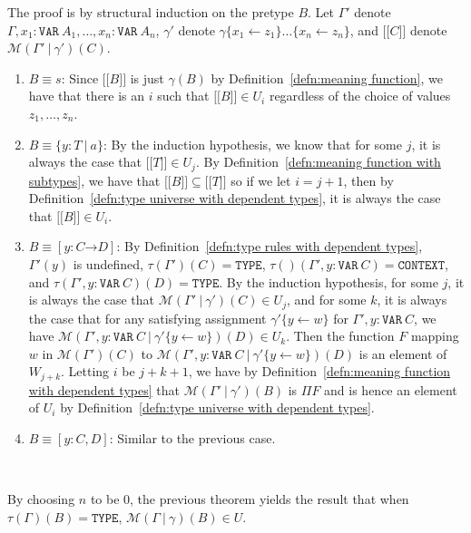 \documentclass [12pt,twoside]{cslreport}
\newcommand{\thmbox}
   {{\ \hfill\hbox{%
      \vrule width1.0ex height1.0ex
   }\parfillskip 0pt }}
\newenvironment{proof}{{\bf Proof. }}{\thmbox}
\newcommand{\aro}{\mathord\rightarrow} %
\newcommand{\mean}[1]{\lbrack\!\lbrack #1 \rbrack\!\rbrack}
\newcommand{\funtype}[2]{[#1 \aro #2]}
\newcommand{\tupletype}[1]{[#1]}
\newcommand{\tauGamma}[1]{\tau(\Gamma)(#1)}
\newcommand{\Mgamma}[1]{{\mathcal M}(\Gamma\vbar\gamma)(#1)}
\newcommand{\tttype}{\mathtt{TYPE}}
\newcommand{\ttcontext}{\mathtt{CONTEXT}}
\newcommand{\ttvar}{\mathtt{VAR}}
\newcommand{\vbar}{\ |\ }
\begin{document}
\begin{proof}
The proof is by structural induction on the pretype $B$\@.
Let $\Gamma'$ denote $\Gamma, x_1:\ttvar~A_1, \ldots, x_n:\ttvar~A_n$,
$\gamma'$ denote $\gamma\{x_1\gets z_1\}\ldots\{x_n\gets z_n\}$, and 
$\mean{C}$ denote $\mathcal{M}(\Gamma'\vbar
\gamma')(C)$.  
\begin{enumerate}
\item $B\equiv s$: Since $\mean{B}$ is just $\gamma(B)$ by
Definition~\ref{defn:meaning function}, we have that there is an $i$
such that $\mean{B}\in U_i$ regardless of the choice of values
$z_1,\ldots, z_n$\@.  

\item $B\equiv \{y:T\vbar a\}$: By the induction hypothesis, we know that
for some $j$, it is always the case that $\mean{T}\in U_j$\@.  By
Definition~\ref{defn:meaning function with subtypes}, we have that
$\mean{B}\subseteq \mean{T}$ so if we let $i = j+1$, then
by Definition~\ref{defn:type universe with dependent types},
it is always the case that $\mean{B}\in U_i$\@.

\item $B \equiv \funtype{y:C}{D}$: By
Definition~\ref{defn:type rules with dependent types},
$\Gamma'(y)$ is undefined, $\tau(\Gamma')(C) = \tttype$,
$\tau()(\Gamma', y:\ttvar~C) = \ttcontext$, and
$\tau(\Gamma', y:\ttvar~C)(D) = \tttype$.
By the induction hypothesis, for some $j$,
it is always the case that $\mathcal{M}(\Gamma'\vbar\gamma')(C)\in U_j$,
and for some $k$, it is always the case that for any satisfying
assignment $\gamma'\{y\gets w\}$ for $\Gamma', y:\ttvar~C$,
we have $\mathcal{M}(\Gamma', y:\ttvar~C\vbar \gamma'\{y\gets
w\})(D)\in U_k$\@.   Then the function $F$ mapping $w$ in
$\mathcal{M}(\Gamma')(C)$ to $\mathcal{M}(\Gamma', y:\ttvar~C\vbar
\gamma'\{y\gets w\})(D)$ is an element of $W_{j+k}$\@.
Letting $i$ be $j+k+1$, we have by
Definition~\ref{defn:meaning function with dependent types}
that $\mathcal{M}(\Gamma'\vbar\gamma')(B)$ is
$\Pi{F}$ and is hence an element of $U_i$ by
Definition~\ref{defn:type universe with dependent types}\@.

\item $B\equiv \tupletype{y: C, D}$:  Similar to the
previous case.  
\end{enumerate}
\end{proof}

By choosing $n$ to be $0$, the previous theorem yields the result 
that when $\tauGamma{B} = \tttype$, $\Mgamma{B}\in U$\@.
\end{document}
